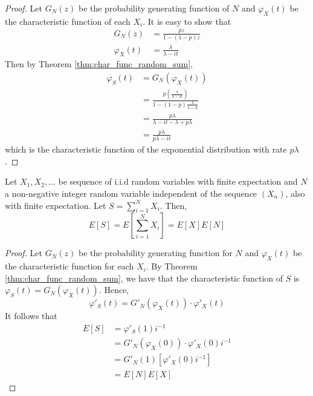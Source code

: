 \begin{proof}
Let $G_N(z)$ be the probability generating function of $N$ and $\varphi_X(t)$ be the characteristic function of each $X_i$.
It is easy to show that
\begin{align*}
    G_N(z) &= \frac{pz}{1 - (1 - p)z}\\
    \varphi_X(t) &= \frac{\lambda}{\lambda - it}
\end{align*}
Then by Theorem \ref{thm:char_func_random_sum},
\begin{align*}
    \varphi_S(t) &= G_N(\varphi_X(t))\\
    &= \frac{
        p \left( \frac{\lambda}{\lambda - it} \right)
        } {
        1 - (1 - p) \frac{\lambda}{\lambda - it}
        }\\
    &= \frac{
        p \lambda
    } {
        \lambda - it - \lambda + p \lambda
    }\\
    &= \frac{
        p \lambda
    } {
        p \lambda - it
    }
\end{align*}
which is the characteristic function of the exponential distribution with rate $p \lambda$.
\end{proof}

\begin{theorem}\label{thm:random_sum_ev}
Let $X_1, X_2, \ldots$ be sequence of i.i.d random variables with finite expectation and $N$ a non-negative integer random variable independent of the sequence $(X_n)$, also with finite expectation.
Let $S = \sum_{i = 1}^N X_i$.
Then,
$$
E[ S ] = E\left[\sum_{i = 1}^N X_i\right] = E[X] E[N]
$$
\end{theorem}

\begin{proof}
Let $G_N(z)$  be the probability generating function for $N$ and $\varphi_X(t)$ be the characteristic function for each $X_i$.
By Theorem \ref{thm:char_func_random_sum}, we have that the characteristic function of $S$ is $\varphi_S(t) = G_N(\varphi_X(t))$.
Hence,
$$
\varphi'_S(t) = G'_N(\varphi_X(t)) \cdot \varphi'_X(t)
$$
It follows that
\begin{align*}
    E[S] &= \varphi'_S(1) i^{-1}\\
    &=  G'_N(\varphi_X(0)) \cdot \varphi'_X(0) i^{-1}\\
    &= G'_N(1) [\varphi'_X(0) i^{-1}]   \\
    &= E[N] E[X]
\end{align*}

\end{proof}

